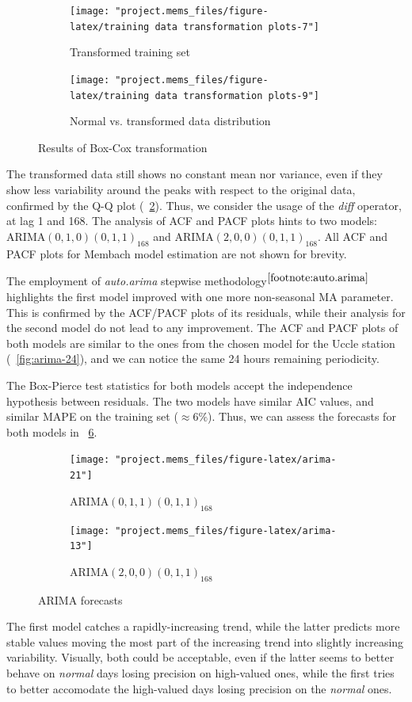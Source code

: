 \documentclass[12pt]{article}
\begin{document}
\begin{figure}[h]
	\begin{subfigure}{.5\linewidth}
		\texttt{[image: "project.mems\_files/figure-latex/training data transformation plots-7"]}
		\caption{Transformed training set}
		\label{fig:mems:box-cox:data}
	\end{subfigure}
	\begin{subfigure}{.5\linewidth}
		\texttt{[image: "project.mems\_files/figure-latex/training data transformation plots-9"]}
		\caption{Normal vs. transformed data distribution}
		\label{fig:mems:box-cox:qq}
	\end{subfigure}
	\caption{Results of Box-Cox transformation}
	\label{fig:mems:box-cox}
\end{figure}
%
The transformed data still shows no constant mean nor variance, even if they show less variability around the peaks with respect to the original data, confirmed by the Q-Q plot (\figurename~\ref{fig:mems:box-cox:qq}). Thus, we consider the usage of the \textit{diff} operator, at lag 1 and 168. The analysis of ACF and PACF plots hints to two models: $\mathrm{ARIMA}(0,1,0)(0,1,1)_{168}$ and $\mathrm{ARIMA}(2,0,0)(0,1,1)_{168}$. All ACF and PACF plots for Membach model estimation are not shown for brevity.

The employment of \textit{auto.arima} stepwise methodology$^{\ref{footnote:auto.arima}}$ highlights the first model improved with one more non-seasonal MA parameter. This is confirmed by the ACF/PACF plots of its residuals, while their analysis for the second model do not lead to any improvement.
The ACF and PACF plots of both models are similar to the ones from the chosen model for the Uccle station (\figurename~\ref{fig:arima-24}), and we can notice the same 24 hours remaining periodicity.

The Box-Pierce test statistics for both models accept the independence hypothesis between residuals. The two models have similar AIC values, and similar MAPE on the training set ($\approx6\%$). Thus, we can assess the forecasts for both models in \figurename~\ref{fig:mems:arima}.

\begin{figure}[h]
	\begin{subfigure}{.5\linewidth}
		\texttt{[image: "project.mems\_files/figure-latex/arima-21"]}
		\caption{$\mathrm{ARIMA}(0,1,1)(0,1,1)_{168}$}
		\label{fig:mems:arima:011011}
	\end{subfigure}
	\begin{subfigure}{.5\linewidth}
		\texttt{[image: "project.mems\_files/figure-latex/arima-13"]}
		\caption{$\mathrm{ARIMA}(2,0,0)(0,1,1)_{168}$}
		\label{fig:mems:arima:200011}
	\end{subfigure}
	\caption{ARIMA forecasts}
	\label{fig:mems:arima}
\end{figure}
%
The first model catches a rapidly-increasing trend, while the latter predicts more stable values moving the most part of the increasing trend into slightly increasing variability. Visually, both could be acceptable, even if the latter seems to better behave on \textit{normal} days losing precision on high-valued ones, while the first tries to better accomodate the high-valued days losing precision on the \textit{normal} ones.
\end{document}
